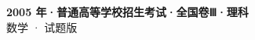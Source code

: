 \documentclass[zihao=-4, a4paper]{ctexart}
\begin{document}
\begin{center}
  {\Large\bfseries 2005 年·普通高等学校招生考试·全国卷Ⅲ·理科}\\[4pt]
  {\large 数学 · 试题版}
\end{center}
\medskip
{}

\end{document}
